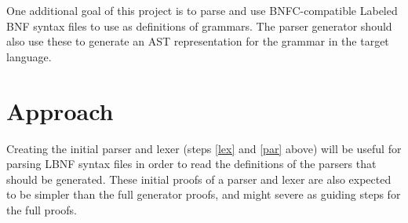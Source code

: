 \documentclass{article}
\begin{document}
	One additional goal of this project is to parse and use BNFC-compatible
	Labeled BNF syntax files to use as definitions of grammars. The parser
	generator should also use these to generate an AST representation for the
	grammar in the target language.

\section{Approach}





	Creating the initial parser and lexer (steps \ref{lex} and \ref{par} above)
	will be useful for parsing LBNF syntax files in order to read the
	definitions of the parsers that should be generated. These initial proofs
	of a parser and lexer are also expected to be simpler than the full
	generator proofs, and might severe as guiding steps for the full proofs.
\end{document}
